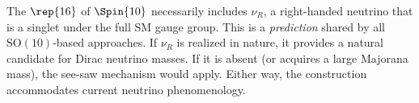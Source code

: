 \begin{remark}
The $\rep{16}$ of $\Spin{10}$ necessarily includes $\nu_R$, a
right-handed neutrino that is a singlet under the full SM gauge group.
This is a \emph{prediction} shared by all $\mathrm{SO}(10)$-based
approaches.  If $\nu_R$ is realized in nature, it provides a natural
candidate for Dirac neutrino masses.  If it is absent (or acquires a
large Majorana mass), the see-saw mechanism would apply.  Either way,
the construction accommodates current neutrino phenomenology.
\end{remark}
